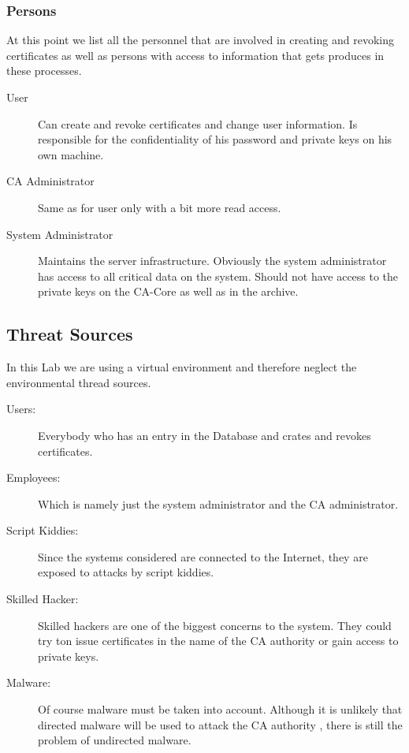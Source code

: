 \documentclass{article}
\begin{document}
\subsubsection{Persons}
At this point we list all the personnel that are involved in creating and revoking certificates as well as persons with access to information that gets produces in these processes.
\begin{description}
\item[User] Can create and revoke certificates and change user information. Is responsible for the confidentiality of his password and private keys on his own machine.
\item[CA Administrator] Same as for user only with a bit more read access.
\item[System Administrator]  Maintains the server infrastructure. Obviously the system administrator has access to all critical data on the system. Should not have access to the private keys on the CA-Core as well as in the archive.
\end{description}
\subsection{Threat Sources}

In this Lab we are using a virtual environment and therefore neglect the environmental thread sources.\\
\begin{description}
\item[Users:] Everybody who has an entry in the Database and crates and revokes certificates.

\item[Employees:] Which is namely just the system administrator and the CA administrator.

\item[Script Kiddies:] Since the systems considered are connected to the Internet, they are exposed to attacks by script kiddies.

\item[Skilled Hacker:] Skilled hackers are one of the biggest concerns to the system. They could try ton issue certificates in the name of the CA authority or gain access to private keys.

\item[Malware:] Of course malware must be taken into account. Although it is unlikely that directed malware will be used to attack the CA authority , there is still the problem of undirected malware.
\end{description}
\end{document}
